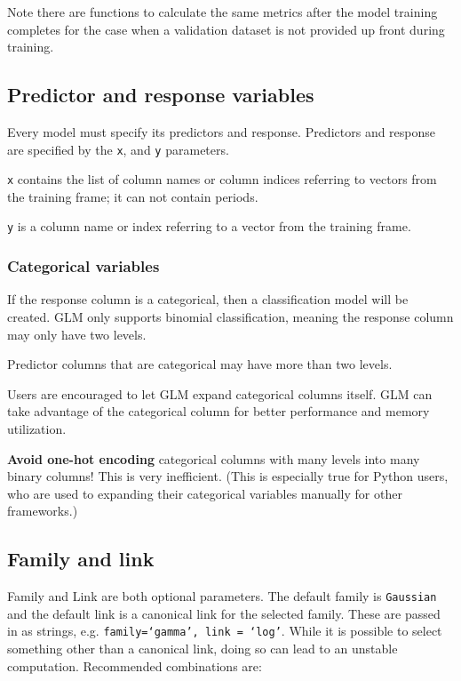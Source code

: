 Note there are functions to calculate the same metrics after the model training completes for the case when a
validation dataset is not provided up front during training.

\subsection{Predictor and response variables}

Every model must specify its predictors and response.  Predictors and response are specified by the \texttt{x},
and \texttt{y} parameters.

\texttt{x} contains the list of column names or column indices referring to vectors from the training frame; it can
not contain periods.

\texttt{y} is a column name or index referring to a vector from the training frame.

\subsubsection{Categorical variables}

If the response column is a categorical, then a classification model will be created.  GLM only supports binomial
classification, meaning the response column may only have two levels.

Predictor columns that are categorical may have more than two levels.

Users are encouraged to let GLM expand categorical columns itself.  GLM can take advantage of the categorical
column for better performance and memory utilization.

\textbf{Avoid one-hot encoding} categorical columns with many levels into many binary columns!  This is very
inefficient.  (This is especially true for Python users, who are used to expanding their categorical variables
manually for other frameworks.)

\subsection{Family and link}

Family and Link are both optional parameters. The default family is \texttt{Gaussian} and the default link is a
canonical link for the selected family. These are passed in as strings, e.g. \texttt{family=`gamma', link = `log'}.
While it is possible to select something other than a canonical link, doing so can lead to an unstable
computation. Recommended combinations are:

